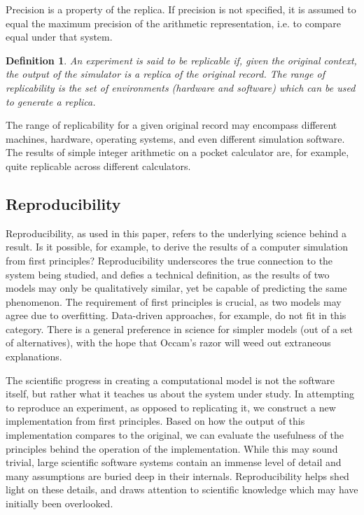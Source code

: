 \documentclass[journal,transmag]{IEEEtran}
\newtheorem{definition}{Definition}
\begin{document}
Precision is a property of the replica.
If precision is not specified, it is assumed to equal the maximum precision
of the arithmetic representation, i.e. to compare equal under that system.

\begin{definition}
An experiment is said to be \textit{replicable} if, given the original context,
the output of the simulator is a replica of the original record.
The \textit{range of replicability} is the set of environments (hardware and software)
which can be used to generate a replica.
\end{definition}

The range of replicability for a given original record may encompass different
machines, hardware, operating systems, and even different simulation software.
The results of simple integer arithmetic on a pocket calculator are, for example,
quite replicable across different calculators.

\subsection{Reproducibility}

Reproducibility, as used in this paper, refers to the underlying science
behind a result.
Is it possible, for example, to derive the results of a computer simulation
from first principles?
Reproducibility underscores the true connection to the system being studied, and defies a technical
definition, as the results of two models may only be qualitatively similar, yet be
capable of predicting the same phenomenon.
The requirement of first principles is crucial, as two models may agree
due to overfitting.
Data-driven approaches, for example, do not fit in this category.
There is a general preference in science for simpler models (out of a set of
alternatives), with the hope
that Occam's razor will weed out extraneous explanations.

The scientific progress in creating a computational model is not the
software itself, but rather what it teaches us about the system under study.
In attempting to reproduce an experiment, as opposed to replicating it,
we construct a new implementation from first principles.
Based on how the output of this implementation compares to the original,
we can evaluate the usefulness of the principles behind the operation
of the implementation.
While this may sound trivial, large scientific software systems
contain an immense level of detail and many assumptions are buried
deep in their internals.
Reproducibility helps shed light on these details, and draws attention
to scientific knowledge which may have initially been overlooked.
\end{document}
